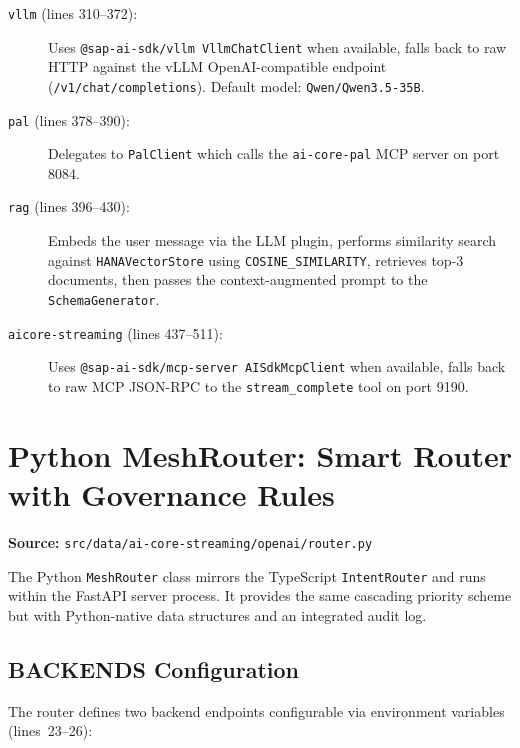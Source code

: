 \documentclass[11pt]{article}
\begin{document}
\begin{description}
  \item[\texttt{vllm} (lines 310--372):] Uses \texttt{@sap-ai-sdk/vllm
        VllmChatClient} when available, falls back to raw HTTP against the
        vLLM OpenAI-compatible endpoint (\texttt{/v1/chat/completions}).
        Default model: \texttt{Qwen/Qwen3.5-35B}.

  \item[\texttt{pal} (lines 378--390):] Delegates to \texttt{PalClient} which
        calls the \texttt{ai-core-pal} MCP server on port 8084.

  \item[\texttt{rag} (lines 396--430):] Embeds the user message via the LLM
        plugin, performs similarity search against
        \texttt{HANAVectorStore} using \texttt{COSINE\_SIMILARITY}, retrieves
        top-3 documents, then passes the context-augmented prompt to the
        \texttt{SchemaGenerator}.

  \item[\texttt{aicore-streaming} (lines 437--511):] Uses
        \texttt{@sap-ai-sdk/mcp-server AISdkMcpClient} when available, falls
        back to raw MCP JSON-RPC to the \texttt{stream\_complete} tool on port
        9190.
\end{description}

\section{Python MeshRouter: Smart Router with Governance Rules}
\label{sec:mesh-router}

\noindent\textbf{Source:}
\texttt{src/data/ai-core-streaming/openai/router.py}

The Python \texttt{MeshRouter} class mirrors the TypeScript \texttt{IntentRouter}
and runs within the FastAPI server process. It provides the same cascading
priority scheme but with Python-native data structures and an integrated
audit log.

\subsection{BACKENDS Configuration}

The router defines two backend endpoints configurable via environment variables
(lines~23--26):
\end{document}
